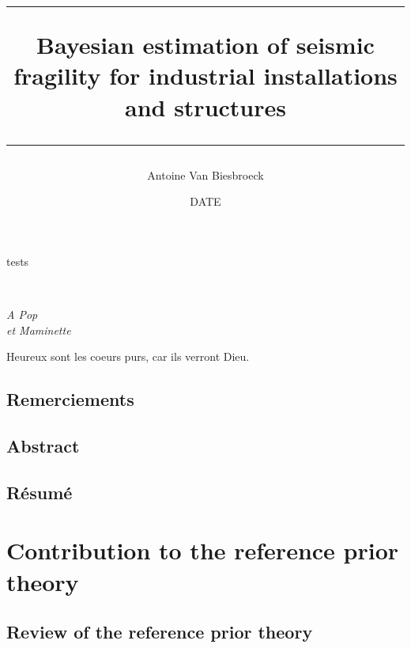 \documentclass[a4paper]{book}
\title{\hrule\vspace*{0.5em}
    \textbf{Bayesian estimation of seismic fragility for industrial installations and structures}
    \vspace*{0.5em}\\ \hrule
    }
\author{Antoine Van Biesbroeck}
\date{DATE}
\renewcommand{\familydefault}{\sfdefault}
\begin{document}
\pagestyle{empty}

tests

\newpage 
\normalsize
\renewcommand{\familydefault}{\rmdefault}
\normalfont


\maketitle

\ 
\vfill
\begin{FlushRight}\itshape
A Pop\\
et Maminette
\end{FlushRight}
\vfill
Heureux sont les coeurs purs, car ils verront Dieu.

\newpage
\pagestyle{plain}

\chapter*{Remerciements}


\newpage

\chapter*{Abstract}

\chapter*{Résumé}


\dominitoc
\setcounter{tocdepth}{1}
\tableofcontents
\newpage

\pagestyle{fancy}\thispagestyle{plain}





\part{Contribution to the reference prior theory}\label{part:ref-theory}

\chapter{Review of the reference prior theory}\label{chap:intro-ref}
\end{document}
